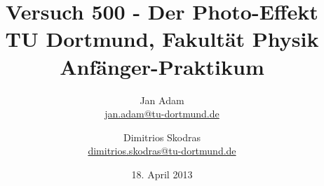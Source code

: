 



\title{Versuch 500 - Der Photo-Effekt\\				%
\large TU Dortmund, Fakultät Physik\\ 
\normalsize Anfänger-Praktikum}

\author{Jan Adam\\			%
{\small \href{jan.adam@tu-dortmund.de}{jan.adam@tu-dortmund.de}}	%
\and						%
Dimitrios Skodras\\					%
{\small \href{dimitrios.skodras@tu-dortmund.de}{dimitrios.skodras@tu-dortmund.de}}		%
}
\date{18. April 2013}				%





\maketitle					%
\thispagestyle{empty} 				%



\tableofcontents


\newpage					%


